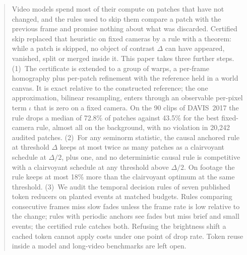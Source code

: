 \begin{abstract}
Video models spend most of their compute on patches that have not changed, and the rules used to skip them compare a patch with the previous frame and promise nothing about what was discarded. Certified skip replaced that heuristic on fixed cameras by a rule with a theorem: while a patch is skipped, no object of contrast $\Delta$ can have appeared, vanished, split or merged inside it. This paper takes three further steps. (1)~The certificate is extended to a group of warps, a per-frame homography plus per-patch refinement with the reference held in a world canvas. It is exact relative to the constructed reference; the one approximation, bilinear resampling, enters through an observable per-pixel term $\iota$ that is zero on a fixed camera. On the 90 clips of DAVIS~2017 the rule drops a median of 72.8\% of patches against 43.5\% for the best fixed-camera rule, almost all on the background, with no violation in 20{,}242 audited patches. (2)~For any seminorm statistic, the causal anchored rule at threshold $\Delta$ keeps at most twice as many patches as a clairvoyant schedule at $\Delta/2$, plus one, and no deterministic causal rule is competitive with a clairvoyant schedule at any threshold above $\Delta/2$. On footage the rule keeps at most 18\% more than the clairvoyant optimum at the same threshold. (3)~We audit the temporal decision rules of seven published token reducers on planted events at matched budgets. Rules comparing consecutive frames miss slow fades unless the frame rate is low relative to the change; rules with periodic anchors see fades but miss brief and small events; the certified rule catches both. Refusing the brightness shift a cached token cannot apply costs under one point of drop rate. Token reuse inside a model and long-video benchmarks are left open.
\end{abstract}
